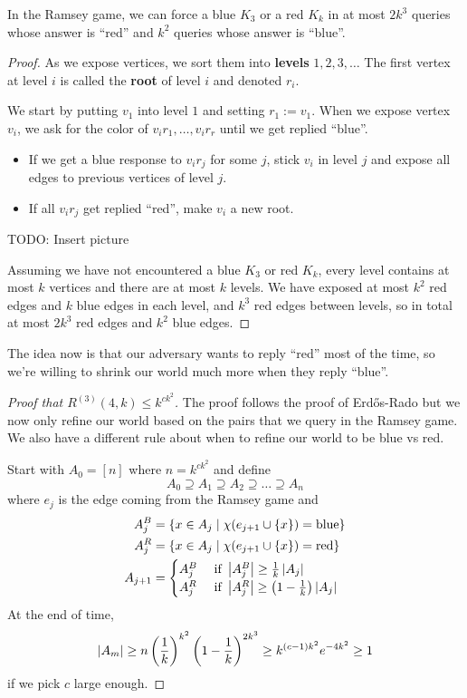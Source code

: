 \documentclass{article}
\begin{document}
\begin{lem}
  In the Ramsey game, we can force a blue $K_3$ or a red $K_k$ in at most $2k^3$ queries whose answer is ``red'' and $k^2$ queries whose answer is ``blue''.
\end{lem}
\begin{proof}
  As we expose vertices, we sort them into {\bf levels} $1, 2, 3, \dots$ The first vertex at level $i$ is called the {\bf root} of level $i$ and denoted $r_i$.

  We start by putting $v_1$ into level $1$ and setting $r_1 := v_1$. When we expose vertex $v_i$, we ask for the color of $v_ir_1, \dots, v_ir_r$ until we get replied ``blue''.
  \begin{itemize}
    \item If we get a blue response to $v_ir_j$ for some $j$, stick $v_i$ in level $j$ and expose all edges to previous vertices of level $j$.
    \item If all $v_ir_j$ get replied ``red'', make $v_i$ a new root.
  \end{itemize}
  TODO: Insert picture

  Assuming we have not encountered a blue $K_3$ or red $K_k$, every level contains at most $k$ vertices and there are at most $k$ levels. We have exposed at most $k^2$ red edges and $k$ blue edges in each level, and $k^3$ red edges between levels, so in total at most $2k^3$ red edges and $k^2$ blue edges.
\end{proof}

The idea now is that our adversary wants to reply ``red'' most of the time, so we're willing to shrink our world much more when they reply ``blue''.

\begin{proof}[Proof that $R^{(3)}(4, k) \le k^{ck^2}$]
  The proof follows the proof of Erd\H os-Rado but we now only refine our world based on the pairs that we query in the Ramsey game. We also have a different rule about when to refine our world to be blue vs red.

  Start with $A_0 = [n]$ where $n = k^{ck^2}$ and define
  $$A_0 \supseteq A_1 \supseteq A_2 \supseteq \dots \supseteq A_n$$
  where $e_j$ is the edge coming from the Ramsey game and
  \begin{align*}
    A_j^B & = \{x \in A_j \mid \chi(e_{j + 1} \cup \{x\}) = \text{blue}\} \\
    A_j^R & = \{x \in A_j \mid \chi(e_{j + 1} \cup \{x\}) = \text{red}\} \\
    A_{j + 1} & =
    \begin{cases}
      A_j^B & \text{ if } \left\lvert A_j^B\right\rvert \ge \frac 1k \left\lvert A_j\right\rvert \\
      A_j^R & \text{ if } \left\lvert A_j^R\right\rvert \ge \left(1 - \frac 1k\right) \left\lvert A_j\right\rvert
    \end{cases}
  \end{align*}
  At the end of time,
  $$\left\lvert A_m\right\rvert \ge n\left(\frac 1k\right)^{k^2}\left(1 - \frac 1k\right)^{2k^3} \ge k^{(c - 1)k^2}e^{-4k^2} \ge 1$$
  if we pick $c$ large enough.
\end{proof}
\end{document}
